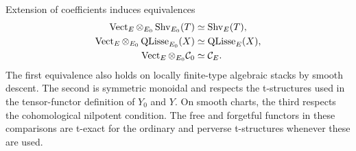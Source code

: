 \begin{lemma}\label{lem:coeff-sheaves}
Extension of coefficients induces equivalences
\begin{align}
 \operatorname{Vect}_E\otimes_{E_0}\operatorname{Shv}_{E_0}(T)&\simeq\operatorname{Shv}_E(T),
 \label{eq:coeff-ambient}\\
 \operatorname{Vect}_E\otimes_{E_0}\operatorname{QLisse}_{E_0}(X)&\simeq\operatorname{QLisse}_E(X),
 \label{eq:coeff-qlisse}\\
 \operatorname{Vect}_E\otimes_{E_0}\mathcal C_0&\simeq\mathcal C_E.
 \label{eq:coeff-nilp}
\end{align}
The first equivalence also holds on locally finite-type algebraic stacks
by smooth descent. The second is symmetric monoidal and respects the
t-structures used in the tensor-functor definition of $Y_0$ and $Y$.
On smooth charts, the third respects the cohomological nilpotent
condition. The free and forgetful functors in these comparisons are
t-exact for the ordinary and perverse t-structures whenever these are
used.
\end{lemma}
